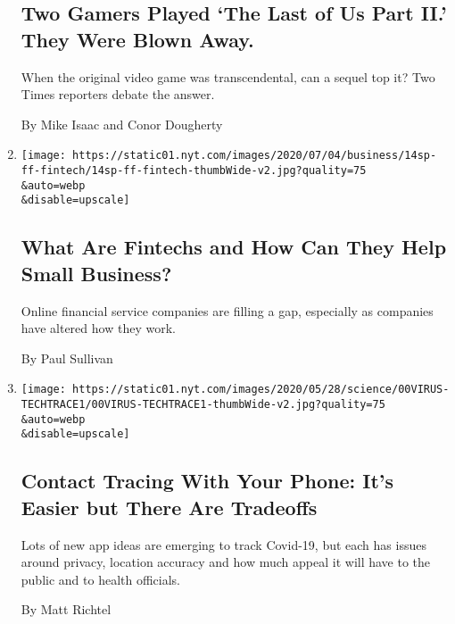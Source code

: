 \begin{enumerate}
  \hypertarget{two-gamers-played-the-last-of-us-part-ii-they-were-blown-away}{%
  \subsection{Two Gamers Played `The Last of Us Part II.' They Were
  Blown
  Away.}\label{two-gamers-played-the-last-of-us-part-ii-they-were-blown-away}}

  When the original video game was transcendental, can a sequel top it?
  Two Times reporters debate the answer.

  By Mike Isaac and Conor Dougherty
\item
  \href{/2020/06/10/business/economy/fintechs-loan-small-business.html}{}

  \texttt{[image: https://static01.nyt.com/images/2020/07/04/business/14sp-ff-fintech/14sp-ff-fintech-thumbWide-v2.jpg?quality=75\\\&auto=webp\\\&disable=upscale]}

  \hypertarget{what-are-fintechs-and-how-can-they-help-small-business}{%
  \subsection{What Are Fintechs and How Can They Help Small
  Business?}\label{what-are-fintechs-and-how-can-they-help-small-business}}

  Online financial service companies are filling a gap, especially as
  companies have altered how they work.

  By Paul Sullivan
\item
  \href{/2020/06/03/health/coronavirus-contact-tracing-apps.html}{}

  \texttt{[image: https://static01.nyt.com/images/2020/05/28/science/00VIRUS-TECHTRACE1/00VIRUS-TECHTRACE1-thumbWide-v2.jpg?quality=75\\\&auto=webp\\\&disable=upscale]}

  \hypertarget{contact-tracing-with-your-phone-its-easier-but-there-are-tradeoffs}{%
  \subsection{Contact Tracing With Your Phone: It's Easier but There Are
  Tradeoffs}\label{contact-tracing-with-your-phone-its-easier-but-there-are-tradeoffs}}

  Lots of new app ideas are emerging to track Covid-19, but each has
  issues around privacy, location accuracy and how much appeal it will
  have to the public and to health officials.

  By Matt Richtel
\end{enumerate}


